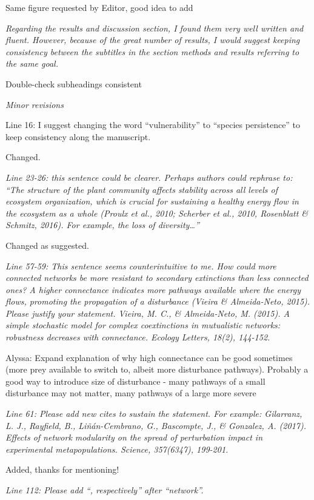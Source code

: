 \documentclass[12pt]{article}
\newcommand{\us}{\rm \setlength{\leftskip}{0.3cm} \setlength{\rightskip}{0.3cm}}
\newcommand{\them}{\it \setlength{\leftskip}{0cm} \setlength{\rightskip}{0cm}}
\begin{document}
\us Same figure requested by Editor, good idea to add

\them
Regarding the results and discussion section, I found them very well written and fluent. However, because of the great number of results, I would suggest keeping consistency between the subtitles in the section methods and results referring to the same goal.

\us Double-check subheadings consistent

\them
Minor revisions

Line 16: I suggest changing the word “vulnerability” to “species persistence” to keep consistency along the manuscript.

\us
Changed.

\them
Line 23-26: this sentence could be clearer. Perhaps authors could rephrase to: “The structure of the plant community affects stability across all levels of ecosystem organization, which is crucial for sustaining a healthy energy flow in the ecosystem as a whole (Proulx et al., 2010; Scherber et al., 2010, Rosenblatt & Schmitz, 2016). For example, the loss of diversity…”

\us Changed as suggested.

\them
Line 57-59: This sentence seems counterintuitive to me. How could more connected networks be more resistant to secondary extinctions than less connected ones? A higher connectance indicates more pathways available where the energy flows, promoting the propagation of a disturbance (Vieira \& Almeida-Neto, 2015). Please justify your statement.
Vieira, M. C., \& Almeida‐Neto, M. (2015). A simple stochastic model for complex coextinctions in mutualistic networks: robustness decreases with connectance. Ecology Letters, 18(2), 144-152.

\us Alyssa: Expand explanation of why high connectance can be good sometimes (more prey available to switch to, albeit more disturbance pathways). Probably a good way to introduce size of disturbance - many pathways of a small disturbance may not matter, many pathways of a large more severe

\them
Line 61: Please add new cites to sustain the statement. For example:
Gilarranz, L. J., Rayfield, B., Liñán-Cembrano, G., Bascompte, J., \& Gonzalez, A. (2017). Effects of network modularity on the spread of perturbation impact in experimental metapopulations. Science, 357(6347), 199-201.

\us
Added, thanks for mentioning!

\them
Line 112: Please add “, respectively” after “network”.
\end{document}
